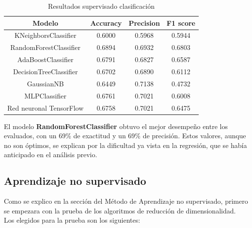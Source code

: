 \documentclass{wsdcr}
\begin{document}
\vspace{5mm}
\begin{table}[H]
    \begin{center}
        \begin{tabular}{| c | c | c | c | }\hline
            Modelo                  & Accuracy & Precision & F1 score \\ \hline
            KNeighborsClassifier    & 0.6000   & 0.5968    & 0.5944   \\
            RandomForestClassifier  & 0.6894   & 0.6932    & 0.6803   \\
            AdaBoostClassifier      & 0.6791   & 0.6827    & 0.6587   \\
            DecisionTreeClassifier  & 0.6702   & 0.6890    & 0.6112   \\
            GaussianNB              & 0.6449   & 0.7138    & 0.4732   \\
            MLPClassifier           & 0.6761   & 0.7021    & 0.6008   \\
            Red neuronal TensorFlow & 0.6758   & 0.7021    & 0.6475   \\ \hline
        \end{tabular}
        \caption{Resultados supervisado clasificación}
        \label{tab:resultados supervisado clasificacion}
    \end{center}
\end{table}

El modelo \textbf{RandomForestClassifier} obtuvo el mejor desempeño entre los evaluados, con un 69\% de exactitud y un 69\% de precisión. Estos valores, aunque no son óptimos, se explican por la dificultad ya vista en la regresión, que se había anticipado en el análisis previo.

\subsection{Aprendizaje no supervisado}

Como se explico en la sección del Método de Aprendizaje no supervisado, primero se empezara con la prueba de los algoritmos de reducción de dimensionalidad. Los elegidos para la prueba son los siguientes:
\end{document}
